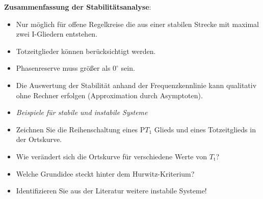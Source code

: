 \textbf{Zusammenfassung der Stabilitätsanalyse}:
\begin{itemize}
	\item Nur möglich für offene Regelkreise die aus einer stabilen Strecke mit maximal zwei I-Gliedern entstehen. 
	\item Totzeitglieder können berücksichtigt werden.
	\item Phasenreserve muss größer als $0^{\circ}$ sein.
	\item Die Auswertung der Stabilität anhand der Frequenzkennlinie kann qualitativ ohne Rechner erfolgen (Approximation durch Asymptoten).
\end{itemize} 
%
\begin{simulation}{}{}%
	\begin{itemize}
		\item \textit{Beispiele für stabile und instabile Systeme}
	\end{itemize}
\end{simulation}
%
\begin{Summary}{}{}
	\begin{itemize}
		\item Zeichnen Sie die Reihenschaltung eines P$T_{1}$ Glieds und eines Totzeitglieds in der Ortskurve.
		\item Wie verändert sich die Ortskurve für verschiedene Werte von $T_{\text{t}}$?
		\item Welche Grundidee steckt hinter dem Hurwitz-Kriterium?
		\item Identifizieren Sie aus der Literatur weitere instabile Systeme!
	\end{itemize}
\end{Summary}
%